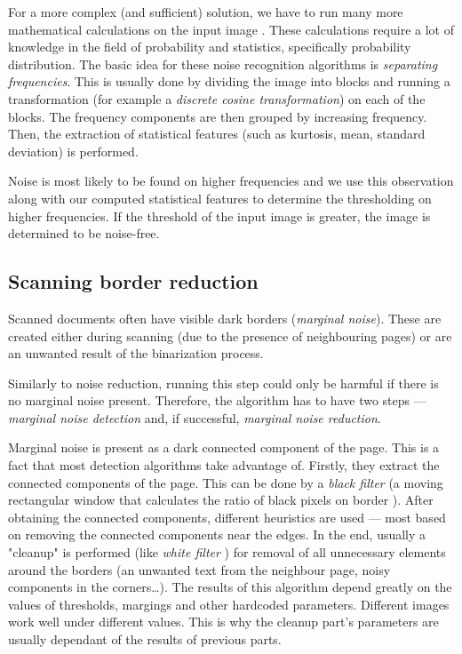 For a more complex (and sufficient) solution, we have to run many more mathematical calculations on the input image \citep{noiseDetection}. These calculations require a lot of knowledge in the field of probability and statistics, specifically probability distribution. The basic idea for these noise recognition algorithms is \emph{separating frequencies}. This is usually done by dividing the image into blocks and running a transformation (for example a \emph{discrete cosine transformation}) on each of the blocks. The frequency components are then grouped by increasing frequency. Then, the extraction of statistical features (such as kurtosis, mean, standard deviation) is performed.

Noise is most likely to be found on higher frequencies and we use this observation along with our computed statistical features to determine the thresholding on higher frequencies. If the threshold of the input image is greater, the image is determined to be noise-free. 

\subsection{Scanning border reduction}

Scanned documents often have visible dark borders (\emph{marginal noise}). These are created either during scanning (due to the presence of neighbouring pages) or are an unwanted result of the binarization process.

Similarly to noise reduction, running this step could only be harmful if there is no marginal noise present. Therefore, the algorithm has to have two steps --- \emph{marginal noise detection} and, if successful, \emph{marginal noise reduction}.

Marginal noise is present as a dark connected component of the page. This is a fact that most detection algorithms take advantage of. Firstly, they extract the connected components of the page. This can be done by a \emph{black filter} (a moving rectangular window that calculates the ratio of black pixels on border \citep{marginalNoiseWindow}). After obtaining the connected components, different heuristics are used --- most based on removing the connected components near the edges. In the end, usually a "cleanup" is performed (like \emph{white filter} \citep{marginalNoiseWindow}) for removal of all unnecessary elements around the borders (an unwanted text from the neighbour page, noisy components in the corners\ldots).
The results of this algorithm depend greatly on the values of thresholds, margings and other hardcoded parameters. Different images work well under different values. This is why the cleanup part's parameters are usually dependant of the results of previous parts.

